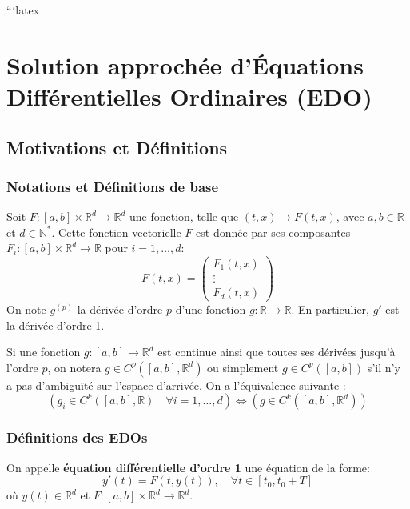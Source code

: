 ```latex

\sloppy

\section{Solution approchée d'Équations Différentielles Ordinaires (EDO)}
\label{sec:solution_approchee_edo}

\subsection{Motivations et Définitions}
\label{ssec:motivations_definitions}

\subsubsection{Notations et Définitions de base}
\label{sssec:notations_definitions_base}
Soit $F: [a,b] \times \mathbb{R}^d \to \mathbb{R}^d$ une fonction, telle que $(t,x) \mapsto F(t,x)$, avec $a, b \in \mathbb{R}$ et $d \in \mathbb{N}^*$.
Cette fonction vectorielle $F$ est donnée par ses composantes $F_i: [a,b] \times \mathbb{R}^d \to \mathbb{R}$ pour $i=1, \dots, d$:
\[
F(t,x) = \begin{pmatrix} F_1(t,x) \\ \vdots \\ F_d(t,x) \end{pmatrix}
\]
On note $g^{(p)}$ la dérivée d'ordre $p$ d'une fonction $g: \mathbb{R} \to \mathbb{R}$. En particulier, $g'$ est la dérivée d'ordre 1.

Si une fonction $g: [a,b] \to \mathbb{R}^d$ est continue ainsi que toutes ses dérivées jusqu'à l'ordre $p$, on notera $g \in C^p([a,b], \mathbb{R}^d)$ ou simplement $g \in C^p([a,b])$ s'il n'y a pas d'ambiguïté sur l'espace d'arrivée.
On a l'équivalence suivante :
\[
(g_i \in C^k([a,b], \mathbb{R}) \quad \forall i=1,\dots,d) \Longleftrightarrow (g \in C^k([a,b], \mathbb{R}^d))
\]

\subsubsection{Définitions des EDOs}
\label{sssec:definitions_edos}
\begin{definition}
On appelle \textbf{équation différentielle d'ordre 1} une équation de la forme:
\[ y'(t) = F(t, y(t)), \quad \forall t \in [t_0, t_0+T] \]
où $y(t) \in \mathbb{R}^d$ et $F: [a,b] \times \mathbb{R}^d \to \mathbb{R}^d$.
\end{definition}

